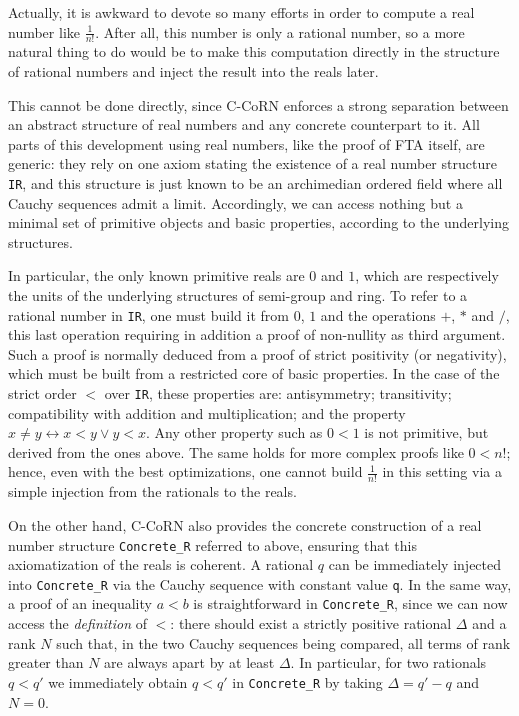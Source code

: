 \documentclass{entcs}
\begin{document}

Actually, it is awkward to devote so many efforts in
order to compute a real number like $\frac1{n!}$. After all,
this number is only a rational number, so a more natural thing to do would
be to make this
computation directly in the structure of rational numbers and inject
the result into the reals later.

This cannot be done directly, since C-CoRN enforces a
strong separation between an abstract structure of real numbers and any
concrete counterpart to it.  All parts of this development using
real numbers, like the proof of FTA itself, are generic: they rely on
one axiom stating the existence of a real number structure \texttt{IR},
and this structure is just known to be an archimedian ordered field
where all Cauchy sequences admit a limit. Accordingly, we can
access nothing but a minimal set of primitive objects and basic
properties, according to the underlying structures.

In particular, the only known primitive reals are $0$ and $1$, which
are respectively the units of the underlying structures of semi-group
and ring. To refer to a rational number in \texttt{IR},
one must build it from $0$, $1$ and the operations $+$, $*$
and $/$, this last operation requiring in addition a proof of
non-nullity as third argument. Such a proof is normally deduced
from a proof of strict positivity (or negativity), which must be built
from a restricted core of basic properties. In the case of the strict
order $<$ over \texttt{IR}, these properties are:
antisymmetry; transitivity; compatibility with addition and multiplication;
and the property $x\neq y\leftrightarrow x<y\vee y<x$. Any other property
such as $0<1$ is not primitive, but derived from the
ones above.  The same holds for more complex
proofs like $0<n!$; hence, even with the best optimizations, one cannot
build $\frac1{n!}$ in this setting via a simple
injection from the rationals to the reals.

On the other hand, C-CoRN also provides the concrete construction of a
real number structure \texttt{Concrete\_R} referred to above, ensuring that
this
axiomatization of the reals is coherent. 
A rational $q$ can be immediately injected into
\texttt{Concrete\_R} via the Cauchy sequence with constant value
\texttt{q}. In the same way, a proof of an inequality $a<b$ is
straightforward in \texttt{Concrete\_R}, since we can now access the
{\it definition} of $<$: there should exist a strictly
positive rational $\Delta$ and a rank $N$ such that, in the two
Cauchy sequences being compared, all terms of rank greater than $N$ are
always apart by at least $\Delta$.  In particular, for two rationals
$q<q'$ we immediately obtain $q<q'$ in \texttt{Concrete\_R} by taking
$\Delta=q'-q$ and $N=0$.
\end{document}
